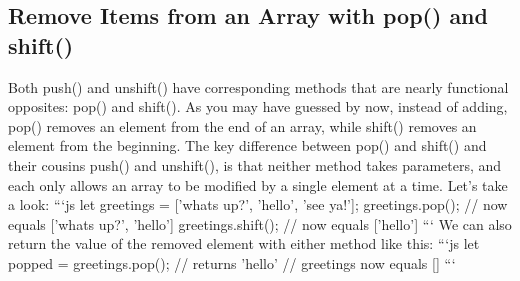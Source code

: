 \documentclass{article}%
\begin{document}
\subsection{Remove Items from an Array with pop() and shift()}%
\label{subsec:RemoveItemsfromanArraywithpop()andshift()}%
Both push() and unshift() have corresponding methods that are nearly functional opposites: pop() and shift(). As you may have guessed by now, instead of adding, pop() removes an element from the end of an array, while shift() removes an element from the beginning. The key difference between pop() and shift() and their cousins push() and unshift(), is that neither method takes parameters, and each only allows an array to be modified by a single element at a time.\newline%
Let's take a look:\newline%
```js\newline%
let greetings = {[}'whats up?', 'hello', 'see ya!'{]};\newline%
greetings.pop();\newline%
// now equals {[}'whats up?', 'hello'{]}\newline%
greetings.shift();\newline%
// now equals {[}'hello'{]}\newline%
```\newline%
We can also return the value of the removed element with either method like this:\newline%
```js\newline%
let popped = greetings.pop();\newline%
// returns 'hello'\newline%
// greetings now equals {[}{]}\newline%
```\newline%

%
\end{document}
